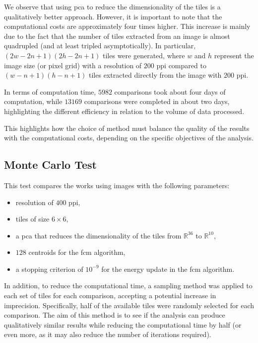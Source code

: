 \begin{toReview}
	We observe that using \gls{pca} to reduce the dimensionality of the tiles is a qualitatively better approach. However, it is important to note that the computational costs are approximately four times higher. This increase is mainly due to the fact that the number of tiles extracted from an image is almost quadrupled (and at least tripled asymptotically). In particular, $(2w-2n+1)(2h-2n+1)$ tiles were generated, where $w$ and $h$ represent the image size (or pixel grid) with a resolution of $200$ \gls{ppi} compared to $(w-n+1)(h-n+1)$ tiles extracted directly from the image with $200$ \gls{ppi}.

	\noindent In terms of computation time, $5982$ comparisons took about four days of computation, while $13169$ comparisons were completed in about two days, highlighting the different efficiency in relation to the volume of data processed.

	\noindent This highlights how the choice of method must balance the quality of the results with the computational costs, depending on the specific objectives of the analysis.

	\subsection{Monte Carlo Test}
	This test compares the works using images with the following parameters:

	\begin{itemize}
		\item resolution of $400$ \gls{ppi},
		\item tiles of size $6\times6$,
		\item a \gls{pca} that reduces the dimensionality of the tiles from $\mathbb{R}^{36}$ to $\mathbb{R}^{10}$,
		\item $128$ centroids for the \gls{fcm} algorithm,
		\item a stopping criterion of $10^{-9}$ for the energy update in the \gls{fcm} algorithm.
	\end{itemize}

	\noindent In addition, to reduce the computational time, a sampling method was applied to each set of tiles for each comparison, accepting a potential increase in imprecision. Specifically, half of the available tiles were randomly selected for each comparison. The aim of this method is to see if the analysis can produce qualitatively similar results while reducing the computational time by half (or even more, as it may also reduce the number of iterations required).


\end{toReview}
